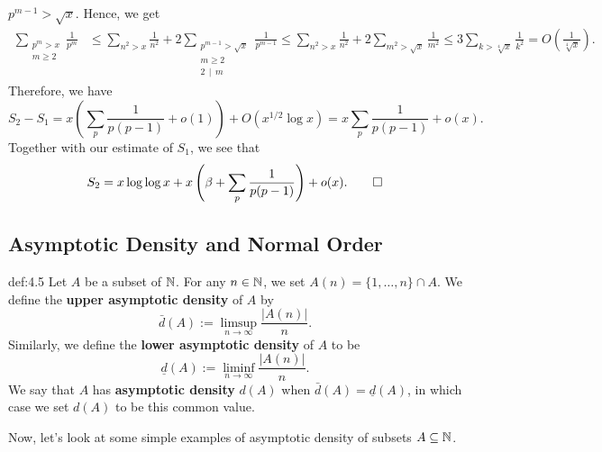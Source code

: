 \begin{pf}
    $p^{m-1} > \sqrt{x}$. Hence, we get 
    \begin{align*} 
        \sum_{\substack{p^m > x \\ m \geq 2}} \frac{1}{p^m} 
        &\leq \sum_{n^2 > x} \frac{1}{n^2} + 2 \sum_{\substack{p^{m-1} > \sqrt{x}
        \\ m \geq 2 \\ 2\,\mid\,m}} \frac{1}{p^{m-1}} 
        \leq \sum_{n^2 > x} \frac{1}{n^2} + 2 \sum_{m^2 > \sqrt{x}} \frac{1}{m^2}  
        \leq 3 \sum_{k > \sqrt[4]{x}} \frac{1}{k^2} = O\left( \frac{1}{\sqrt[4]{x}} \right). 
    \end{align*}
    Therefore, we have 
    \[ S_2 - S_1 = x \left( \sum_p \frac{1}{p(p-1)} + o(1) \right) 
    + O(x^{1/2} \log x) = x \sum_p \frac{1}{p(p-1)} + o(x). \] 
    Together with our estimate of $S_1$, we see that 
    \[ S_2 = x\log\log x + x \left( \beta + \sum_p \frac{1}{p(p-1)} \right) 
    + o(x). \qedhere \] 
\end{pf}

\subsection{Asymptotic Density and Normal Order}\label{subsec:4.3} 

\vspace{2ex}
\begin{defn}{def:4.5}
    Let $A$ be a subset of $\mathbb{N}$. For any $n \in \mathbb{N}$, we set $A(n) 
    = \{1, \dots, n\} \cap A$. We define the {\bf upper asymptotic density}
    of $A$ by 
    \[ \bar{d}(A) := \limsup_{n\to\infty} \frac{|A(n)|}{n}. \] 
    Similarly, we define the {\bf lower asymptotic density} of $A$ to be 
    \[ \underline{d}(A) := \liminf_{n\to\infty} \frac{|A(n)|}{n}. \] 
    We say that $A$ has {\bf asymptotic density} $d(A)$ when 
    $\bar{d}(A) = \underline{d}(A)$, in which case we set $d(A)$ to be 
    this common value. 
\end{defn}

Now, let's look at some simple examples of asymptotic density of subsets 
$A \subseteq \mathbb{N}$. 

